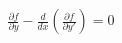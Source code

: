 \documentclass[preview]{standalone}
\begin{document}
\begin{align*}
\frac{\partial f}{\partial y} - \frac{d}{dx} \left( \frac{\partial f}{\partial y'} \right) = 0
\end{align*}
\end{document}
